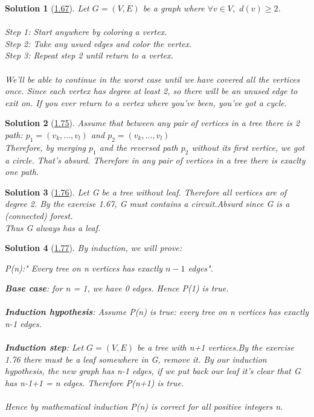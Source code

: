 \documentclass[10pt]{report}
\numberwithin{dummy}{section}
\theoremstyle{ocrenumbox}
\newtheorem{definitionTT}{Solution}[]
\theoremstyle{grayman}
\newenvironment{sol}{\begin{sBox}\begin{definitionTT}}{\end{definitionTT}\end{sBox}}
\begin{document}
\begin{sol}[\hypertarget{so167}{\hyperlink{exo167}{1.67}}]
Let $G=(V,E)$ be a graph where $\forall v \in V,$ $d(v) \ge 2$.\\ \\
Step 1: Start anywhere by coloring a vertex.\\
Step 2: Take any usued edges and color the vertex. \\
Step 3: Repeat step 2 until return to a vertex. \\ \\
We'll be able to continue in the worst case until we have covered all the vertices once. Since each vertex has degree at least 2, so there will be an unused edge to exit on. If you ever return to a vertex where you've been, you've got a cycle.
\end{sol}
\begin{sol}[\hypertarget{so175}{\hyperlink{exo175}{1.75}}]
Assume that between any pair of vertices in a tree there is 2  path: $p_1 = (v_k,...,v_l)$ and $p_2=(v_k,...,v_l)$ \\
Therefore, by merging $p_1$ and the reversed path $p_2$ without its first vertice, we got a circle. That's absurd. Therefore in any pair of vertices in a tree there is exaclty one path.
\end{sol}
\begin{sol}[\hypertarget{so176}{\hyperlink{exo176}{1.76}}]
Let  G be a tree without leaf. Therefore all vertices are of degree 2. By the exercise 1.67, G must contains a circuit.Absurd since G is a (connected) forest.\\
Thus G always has a leaf.
\end{sol}
\begin{sol}[\hypertarget{so177}{\hyperlink{exo177}{1.77}}]
By induction, we will prove:\\

\begin{center}
    P(n):" Every tree on n vertices has exactly $n - 1$ edges".
\end{center}
\textbf{Base case}: for n = 1, we have 0 edges. Hence P(1) is true.\\ \\
\textbf{Induction hypothesis}: Assume P(n) is true: every tree on n vertices has exactly n-1 edges.\\ \\
\textbf{Induction step}: Let $G = (V, E)$ be a tree with n+1 vertices.By the exercise 1.76 there must be a leaf somewhere in G, remove it. By our induction hypothesis, the new graph has n-1 edges, if we put back our leaf it's clear that G has n-1+1 = n edges. Therefore P(n+1) is true.\\ \\
Hence by mathematical induction P(n) is correct for all positive integers n.
\end{sol}
\end{document}
